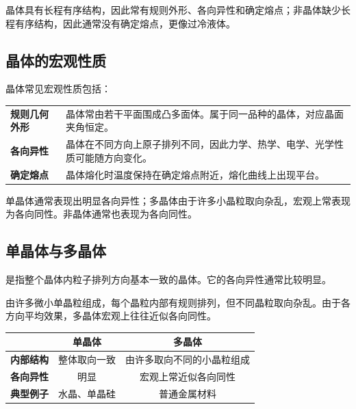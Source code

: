 \begin{KeyBox}[晶体与非晶体的核心差别]
晶体具有长程有序结构，因此常有规则外形、各向异性和确定熔点；非晶体缺少长程有序结构，因此通常没有确定熔点，更像过冷液体。
\end{KeyBox}

\subsection{晶体的宏观性质}

晶体常见宏观性质包括：

\begin{FormulaBox}[晶体的三个典型宏观性质]
\begin{tabularx}{\textwidth}{@{}>{\bfseries}lX@{}}
规则几何外形 & 晶体常由若干平面围成凸多面体。属于同一品种的晶体，对应晶面夹角恒定。\\
各向异性 & 晶体在不同方向上原子排列不同，因此力学、热学、电学、光学性质可能随方向变化。\\
确定熔点 & 晶体熔化时温度保持在确定熔点附近，熔化曲线上出现平台。\\
\end{tabularx}
\end{FormulaBox}

\begin{WarnBox}
单晶体通常表现出明显各向异性；多晶体由于许多小晶粒取向杂乱，宏观上常表现为各向同性。非晶体通常也表现为各向同性。
\end{WarnBox}

\subsection{单晶体与多晶体}

是指整个晶体内粒子排列方向基本一致的晶体。它的各向异性通常比较明显。

由许多微小单晶粒组成，每个晶粒内部有规则排列，但不同晶粒取向杂乱。由于各方向平均效果，多晶体宏观上往往近似各向同性。

\begin{KeyBox}[单晶体与多晶体的对比]
\begin{tabularx}{\textwidth}{@{}>{\bfseries}lCC@{}}
\toprule
 & 单晶体 & 多晶体\\
\midrule
内部结构 & 整体取向一致 & 由许多取向不同的小晶粒组成\\
各向异性 & 明显 & 宏观上常近似各向同性\\
典型例子 & 水晶、单晶硅 & 普通金属材料\\
\bottomrule
\end{tabularx}
\end{KeyBox}

